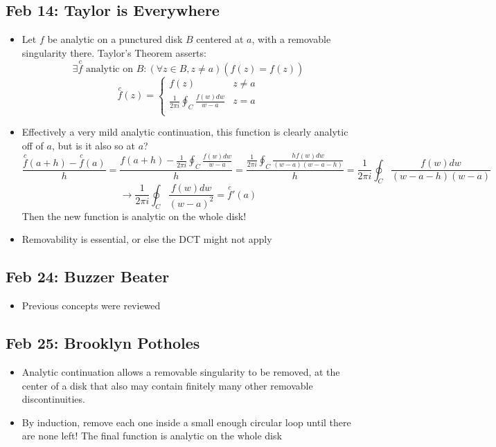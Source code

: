 \documentclass[10pt, oneside]{article}
\begin{document}
\subsection{Feb 14: Taylor is Everywhere}
\begin{itemize}
    \item Let $f$ be analytic on a punctured disk $B$ centered at $a$, with a removable singularity there. Taylor's Theorem asserts:
        \[\exists \overset{c}{f} \text{ analytic on } B : (\forall z \in B, z \neq a)(f(z) = \overset{~}{f}(z)) \]
        \[\overset{c}{f}(z) = \begin{cases}
            f(z) & z \neq a\\
            \frac{1}{2 \pi i} \oint_C \frac{f(w) dw}{w - a} & z = a\\
        \end{cases}\]
    \item Effectively a very mild analytic continuation, this function is clearly analytic off of $a$, but is it also so at $a$?
        \[\frac{\overset{c}{f}(a+h) - \overset{c}{f}(a)}{h} = \frac{f(a+h) - \frac{1}{2 \pi i} \oint_C \frac{f(w) dw}{w - a}}{h} = \frac{\frac{1}{2 \pi i} \oint_C \frac{h f(w) dw}{(w - a)(w - a - h)}}{h} = \frac{1}{2 \pi i} \oint_C \frac{f(w) dw}{(w - a - h)(w - a)}\]
        \[\rightarrow \frac{1}{2 \pi i} \oint_C \frac{f(w) dw}{(w - a)^2} = \overset{c}{f} {}'(a) \]
        Then the new function is analytic on the whole disk!
    \item Removability is essential, or else the DCT might not apply
\end{itemize}

\subsection{Feb 24: Buzzer Beater}
\begin{itemize}
    \item Previous concepts were reviewed
\end{itemize}

\subsection{Feb 25: Brooklyn Potholes}
\begin{itemize}
    \item Analytic continuation allows a removable singularity to be removed, at the center of a disk that also may contain finitely many other removable discontinuities.
    \item By induction, remove each one inside a small enough circular loop until there are none left! The final function is analytic on the whole disk
\end{itemize}
\end{document}
